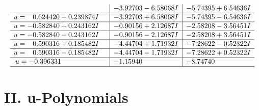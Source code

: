 \documentclass[1p]{elsarticle_modified}
\theoremstyle{definition}
\begin{document}
$$\begin{array}{c|c|c}
 & -3.92703 - 6.58068 I & -5.74395 + 6.54636 I \\ \hline\begin{aligned}
u &= \phantom{-}0.624420 - 0.239874 I\end{aligned}
 & -3.92703 + 6.58068 I & -5.74395 - 6.54636 I \\ \hline\begin{aligned}
u &= -0.582840 + 0.243162 I\end{aligned}
 & -0.90156 + 2.12687 I & -2.58208 - 3.56451 I \\ \hline\begin{aligned}
u &= -0.582840 - 0.243162 I\end{aligned}
 & -0.90156 - 2.12687 I & -2.58208 + 3.56451 I \\ \hline\begin{aligned}
u &= \phantom{-}0.590316 + 0.185482 I\end{aligned}
 & -4.44704 + 1.71932 I & -7.28622 - 0.52322 I \\ \hline\begin{aligned}
u &= \phantom{-}0.590316 - 0.185482 I\end{aligned}
 & -4.44704 - 1.71932 I & -7.28622 + 0.52322 I \\ \hline\begin{aligned}
u &= -0.396331\phantom{ +0.000000I}\end{aligned}
 & -1.15940\phantom{ +0.000000I} & -8.74740\phantom{ +0.000000I}\\
 \hline 
 \end{array}$$\newpage
\newpage\renewcommand{\arraystretch}{1}
\centering \section*{ II. u-Polynomials}
\end{document}
